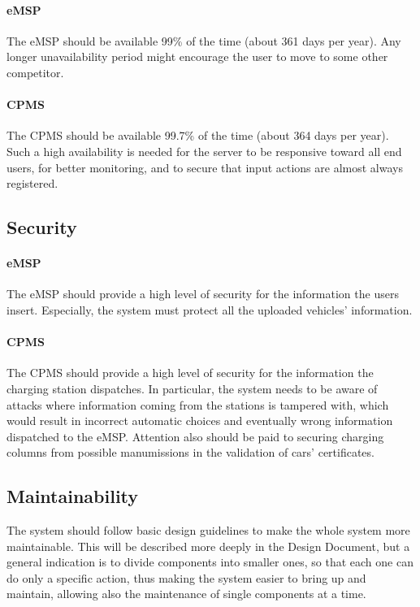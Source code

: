\paragraph{eMSP} The eMSP should be available 99\% of the time (about 361 days per year). Any longer unavailability period might encourage the user to move to some other competitor.

\paragraph{CPMS} The CPMS should be available 99.7\% of the time (about 364 days per year). Such a high availability is needed for the server to be responsive toward all end users, for better monitoring, and to secure that input actions are almost always registered.

\pagebreak

\subsection{Security}

\paragraph{eMSP} The eMSP should provide a high level of security for the information the users insert. Especially, the system must protect all the uploaded vehicles' information.

\paragraph{CPMS} The CPMS should provide a high level of security for the information the charging station dispatches. In particular, the system needs to be aware of  attacks where information coming from the stations is tampered with, which would result in incorrect automatic choices and eventually wrong information dispatched to the eMSP. Attention also should be paid to securing charging columns from possible manumissions in the validation of cars' certificates.

\subsection{Maintainability}

The system should follow basic design guidelines to make the whole system more maintainable. This will be described more deeply in the Design Document, but a general indication is to divide components into smaller ones, so that each one can do only a specific action, thus making the system easier to bring up and maintain, allowing also the maintenance of single components at a time.

